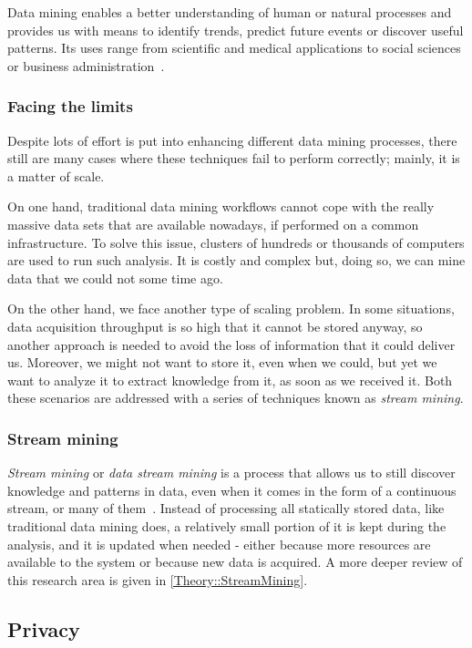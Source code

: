 Data mining enables a better understanding of human or natural processes and provides
us with means to identify trends, predict future events or discover useful patterns.
Its uses range from scientific and medical applications to social sciences or business
administration~\citep{Fayyad:FromDataMining}.

\subsubsection{Facing the limits}

Despite lots of effort is put into enhancing different data mining processes, there still
are many cases where these techniques fail to perform correctly; mainly, it is a matter of scale.

On one hand, traditional data mining workflows cannot cope with the really massive
data sets that are available nowadays, if performed on a common infrastructure.
To solve this issue, clusters of hundreds or thousands of computers are used to run
such analysis. It is costly and complex but, doing so, we can mine data that we could not
some time ago.

On the other hand, we face another type of scaling problem. In some situations, data
acquisition throughput is so high that it cannot be stored anyway, so another approach
is needed to avoid the loss of information that it could deliver us. Moreover, we might
not want to store it, even when we could, but yet we want to analyze it to extract
knowledge from it, as soon as we received it. Both these scenarios are addressed with a
series of techniques known as \textit{stream mining}.

\subsubsection{Stream mining}

\textit{Stream mining} or \textit{data stream mining} is a process that allows us to
still discover knowledge and patterns in data, even when it comes in the form of a
continuous stream, or many of them~\citep{Rajaraman:MiningMassiveDatasets}. Instead of processing
all statically stored data, like traditional data mining does, a relatively small
portion of it is kept during the analysis, and it is updated when needed - either because
more resources are available to the system or because new data is acquired. A more deeper
review of this research area is given in \ref{Theory::StreamMining}.

\subsection{Privacy}
\label{Introduction::Context::Privacy}

